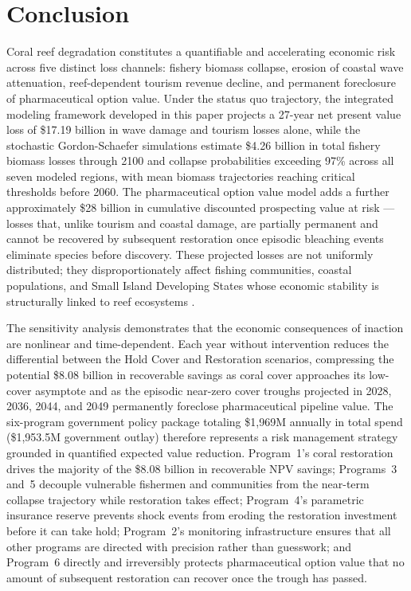 \documentclass[10pt,letterpaper]{article}
\newcounter{gs}
\begin{document}
\section*{Conclusion}

Coral reef degradation constitutes a quantifiable and accelerating economic risk across five distinct loss channels: fishery biomass collapse, erosion of coastal wave attenuation, reef-dependent tourism revenue decline, and permanent foreclosure of pharmaceutical option value. Under the status quo trajectory, the integrated modeling framework developed in this paper projects a 27-year net present value loss of \$17.19 billion in wave damage and tourism losses alone, while the stochastic Gordon-Schaefer simulations estimate \$4.26 billion in total fishery biomass losses through 2100 and collapse probabilities exceeding 97\% across all seven modeled regions, with mean biomass trajectories reaching critical thresholds before 2060. The pharmaceutical option value model adds a further approximately \$28 billion in cumulative discounted prospecting value at risk --- losses that, unlike tourism and coastal damage, are partially permanent and cannot be recovered by subsequent restoration once episodic bleaching events eliminate species before discovery. These projected losses are not uniformly distributed; they disproportionately affect fishing communities, coastal populations, and Small Island Developing States whose economic stability is structurally linked to reef ecosystems \cite{cesar_economics_2003, cesar_beukering_2004}.

The sensitivity analysis demonstrates that the economic consequences of inaction are nonlinear and time-dependent. Each year without intervention reduces the differential between the Hold Cover and Restoration scenarios, compressing the potential \$8.08 billion in recoverable savings as coral cover approaches its low-cover asymptote and as the episodic near-zero cover troughs projected in 2028, 2036, 2044, and 2049 permanently foreclose pharmaceutical pipeline value. The six-program government policy package totaling \$1,969M annually in total spend (\$1,953.5M government outlay) therefore represents a risk management strategy grounded in quantified expected value reduction. Program~1's coral restoration drives the majority of the \$8.08 billion in recoverable NPV savings; Programs~3 and~5 decouple vulnerable fishermen and communities from the near-term collapse trajectory while restoration takes effect; Program~4's parametric insurance reserve prevents shock events from eroding the restoration investment before it can take hold; Program~2's monitoring infrastructure ensures that all other programs are directed with precision rather than guesswork; and Program~6 directly and irreversibly protects pharmaceutical option value that no amount of subsequent restoration can recover once the trough has passed.
\end{document}
